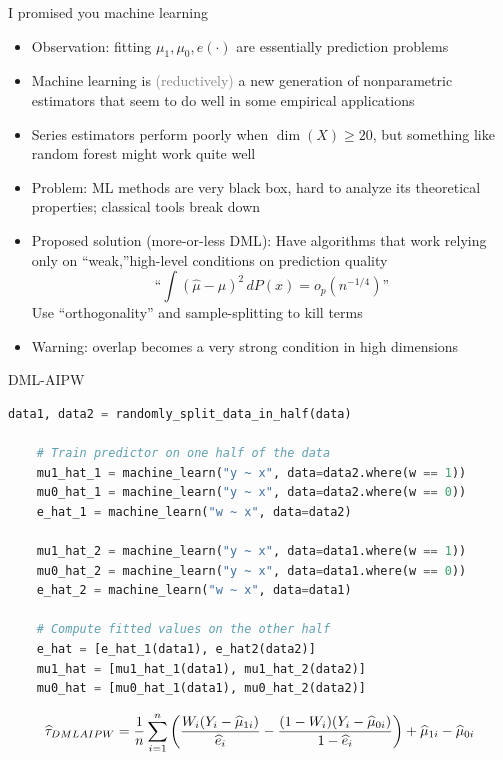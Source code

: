 \documentclass[10pt,aspectratio=169,handout]{beamer}
\theoremstyle{definition}
\newcommand{\light}[1]{\textcolor{gray}{#1}}
\begin{document}
\begin{frame}{I promised you machine learning}
  \begin{itemize}
    \item Observation: fitting $\mu_1, \mu_0, e(\cdot)$ are essentially
    prediction problems
    \item Machine learning is \light{(reductively)} a new generation of
    nonparametric estimators that seem to do well in some empirical
    applications
    \item Series estimators perform poorly when $\dim(X) \ge 20$, but
    something like random forest might work quite well
    \item Problem: ML methods are very black box, hard to analyze its
    theoretical properties; classical tools break down
    \item Proposed solution (more-or-less \alert{DML}): Have algorithms
    that work
    relying only on ``weak,''high-level conditions on prediction
    quality \[\text{``$\displaystyle \int (\hat \mu - \mu)^2\,dP(x) = o_p
    (n^
    {-1/4})$''}\]
    Use ``orthogonality'' and sample-splitting to kill terms
    \item \alert{Warning}: overlap  becomes a very strong condition in high
    dimensions
  \end{itemize}
\end{frame}

\begin{frame}[fragile]{DML-AIPW}
\scriptsize
\begin{center}
    \begin{lstlisting}[language=Python]
    data1, data2 = randomly_split_data_in_half(data)
    
    # Train predictor on one half of the data
    mu1_hat_1 = machine_learn("y ~ x", data=data2.where(w == 1))
    mu0_hat_1 = machine_learn("y ~ x", data=data2.where(w == 0))
    e_hat_1 = machine_learn("w ~ x", data=data2)
    
    mu1_hat_2 = machine_learn("y ~ x", data=data1.where(w == 1))
    mu0_hat_2 = machine_learn("y ~ x", data=data1.where(w == 0))
    e_hat_2 = machine_learn("w ~ x", data=data1)
    
    # Compute fitted values on the other half
    e_hat = [e_hat_1(data1), e_hat2(data2)]
    mu1_hat = [mu1_hat_1(data1), mu1_hat_2(data2)]
    mu0_hat = [mu0_hat_1(data1), mu0_hat_2(data2)]
  \end{lstlisting}
\end{center}
  \small
  \[
  \widehat \tau_{DMLAIPW} = \frac{1}{n}\sum_{i=1}^n \left({\frac{W_i
    (Y_i-\widehat \mu_{1i})}{\widehat e_i} - \frac{(1-W_i)(Y_i-\widehat \mu_{0i})}{1-\widehat
    e_i}}\right) + \widehat\mu_{1i} - \widehat\mu_{0i}
  \]
  
\end{frame}
\end{document}

